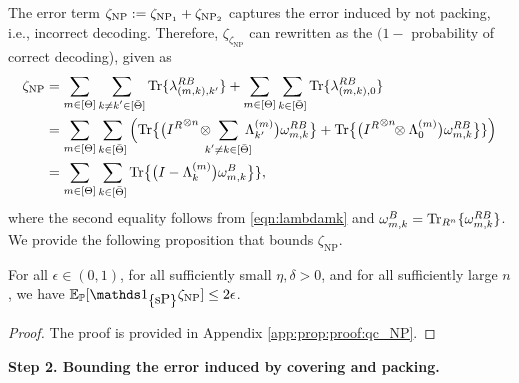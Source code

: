 \noindent The error term $\zeta_{\text{NP}} := \zeta_{\text{NP}_1} + \zeta_{\text{NP}_2}$ captures the error induced by not packing, i.e., incorrect decoding. Therefore, $\zeta_{\zeta_{\text{NP}}}$ can rewritten as the $(1-$ probability of correct decoding), given as
\begin{align}
\zeta_{\text{NP}} &= \sum_{m \in [\Theta]}\sum_{\substack{k \neq k' \in [\bTheta]}}  \Tr\{\lambda_{(m,k),k'}^{\refe B}\} +  \sum_{m \in [\Theta]}\sum_{\substack{k\in [\bTheta]}} \Tr\{\lambda_{(m,k),0}^{\refe B}\}\nonumber\\
&= \sum_{m \in [\Theta]}\sum_{\substack{k\in [\bTheta]}} \Big(\Tr\big\{\big({I^{\refe}}^{\tensor n} \!\tensor\!\!\!\!\sum_{\substack{k' \neq k \in [\bTheta]}} \!\!\!\!\dpovm_{k'}^{(m)} \big)\omega^{RB}_{m,k}\big\}   +   \Tr\big\{\big({I^{\refe}}^{\tensor n} \!\!\tensor \dpovm_{0}^{(m)} \big)\omega^{RB}_{m,k}\big\}\}\Big)\nonumber\\
& = \sum_{m \in [\Theta]}\sum_{\substack{k\in [\bTheta]}}
\Tr\big\{\big(I-\dpovm_{k}^{(m)} \big)\omega^{B}_{m,k}\big\}\}\label{eqn:zetaNP},
\end{align}
where the second equality follows from \eqref{eqn:lambdamk} and $\omega^B_{m,k} = \text{Tr}_{R^n}\{\omega^{R B}_{m,k}\}$. We provide the following proposition that bounds $\zeta_{\text{NP}}$.
\begin{prop}\label{prop:qc_NP}
    For all $\epsilon\in(0,1)$, for all sufficiently small $\eta, \delta>0$, and for all sufficiently large $n$, we have $\EE_\PP[\I_{\curly{\mbox{\normalfont sP}}}\zeta_{\text{NP}}]\leq 2\epsilon$.
\end{prop}
\begin{proof}
The proof is provided in Appendix \ref{app:prop:proof:qc_NP}.
\end{proof}
\noindent \textbf{Step 2. Bounding the error induced by covering and packing.} 

